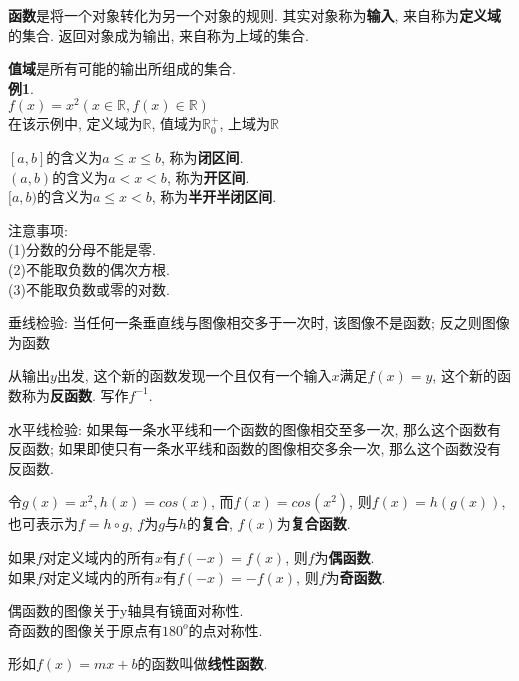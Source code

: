 \documentclass[UTF8, fontset=ubuntu]{ctexart}
\begin{document}
\textbf{函数}是将一个对象转化为另一个对象的规则. 其实对象称为\textbf{输入}, 来自称为\textbf{定义域}的集合. 返回对象成为{输出}, 来自称为{上域}的集合.

\textbf{值域}是所有可能的输出所组成的集合.\\
\textbf{例1}.\\
$f(x)=x^2(x\in\mathbb{R}, f(x)\in\mathbb{R})$\\
在该示例中, 定义域为$\mathbb{R}$, 值域为$\mathbb{R}^+_0$, 上域为$\mathbb{R}$

$[a,b]$的含义为$a\leqslant x\leqslant b$, 称为\textbf{闭区间}.\\
$(a,b)$的含义为$a<x<b$, 称为\textbf{开区间}.\\
$[a,b)$的含义为$a\leqslant x<b$, 称为\textbf{半开半闭区间}.

注意事项:\\
(1)分数的分母不能是零.\\
(2)不能取负数的偶次方根.\\
(3)不能取负数或零的对数.

垂线检验: 当任何一条垂直线与图像相交多于一次时, 该图像不是函数; 反之则图像为函数

从输出$y$出发, 这个新的函数发现一个且仅有一个输入$x$满足$f(x)=y$, 这个新的函数称为\textbf{反函数}. 写作$f^{-1}$.

水平线检验: 如果每一条水平线和一个函数的图像相交至多一次, 那么这个函数有反函数; 如果即使只有一条水平线和函数的图像相交多余一次, 那么这个函数没有反函数.

令$g(x)=x^2, h(x)=cos(x)$, 而$f(x)=cos(x^2)$, 则$f(x)=h(g(x))$, 也可表示为$f=h\circ g$, $f$为$g$与$h$的\textbf{复合}, $f(x)$为\textbf{复合函数}.

如果$f$对定义域内的所有$x$有$f(-x)=f(x)$, 则$f$为\textbf{偶函数}.\\
如果$f$对定义域内的所有$x$有$f(-x)=-f(x)$, 则$f$为\textbf{奇函数}.

偶函数的图像关于y轴具有镜面对称性.\\
奇函数的图像关于原点有$180^o$的点对称性.

形如$f(x)=mx+b$的函数叫做\textbf{线性函数}.
\end{document}
